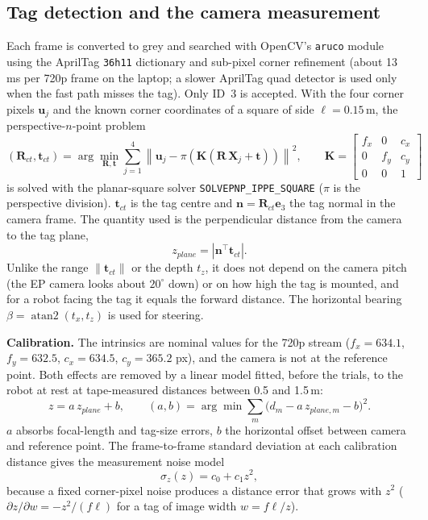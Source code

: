 \documentclass[11pt,a4paper]{article}
\begin{document}
\subsection{Tag detection and the camera measurement}
Each frame is converted to grey and searched with OpenCV's \texttt{aruco} module using the AprilTag \texttt{36h11} dictionary and sub-pixel corner refinement (about 13\,ms per 720p frame on the laptop; a slower AprilTag quad detector is used only when the fast path misses the tag). Only ID~3 is accepted. With the four corner pixels $\bm u_j$ and the known corner coordinates of a square of side $\ell=0.15$\,m, the perspective-$n$-point problem
\begin{equation}
(\bm R_{ct},\bm t_{ct})=\arg\min_{\bm R,\bm t}\sum_{j=1}^{4}\left\|\bm u_j-\pi\!\left(\bm K(\bm R\,\bm X_j+\bm t)\right)\right\|^2,\qquad
\bm K=\begin{bmatrix}f_x&0&c_x\\0&f_y&c_y\\0&0&1\end{bmatrix}
\label{eq:pnp}
\end{equation}
is solved with the planar-square solver \texttt{SOLVEPNP\_IPPE\_SQUARE} ($\pi$ is the perspective division). $\bm t_{ct}$ is the tag centre and $\bm n=\bm R_{ct}\bm e_3$ the tag normal in the camera frame. The quantity used is the perpendicular distance from the camera to the tag plane,
\begin{equation}
z_{plane}=\left|\bm n^{\!\top}\bm t_{ct}\right|.
\label{eq:plane}
\end{equation}
Unlike the range $\|\bm t_{ct}\|$ or the depth $t_z$, it does not depend on the camera pitch (the EP camera looks about $20^\circ$ down) or on how high the tag is mounted, and for a robot facing the tag it equals the forward distance. The horizontal bearing $\beta=\operatorname{atan2}(t_x,t_z)$ is used for steering.

\textbf{Calibration.} The intrinsics are nominal values for the 720p stream ($f_x=634.1$, $f_y=632.5$, $c_x=634.5$, $c_y=365.2$ px), and the camera is not at the reference point. Both effects are removed by a linear model fitted, before the trials, to the robot at rest at \CalN{} tape-measured distances between 0.5 and 1.5\,m:
\begin{equation}
z=a\,z_{plane}+b,\qquad (a,b)=\arg\min\sum_{m}\big(d_m-a\,z_{plane,m}-b\big)^2 .
\label{eq:calib}
\end{equation}
$a$ absorbs focal-length and tag-size errors, $b$ the horizontal offset between camera and reference point. The frame-to-frame standard deviation at each calibration distance gives the measurement noise model
\begin{equation}
\sigma_z(z)=c_0+c_1 z^2,
\label{eq:R}
\end{equation}
because a fixed corner-pixel noise produces a distance error that grows with $z^2$ ($\partial z/\partial w=-z^2/(f\ell)$ for a tag of image width $w=f\ell/z$).
\end{document}

